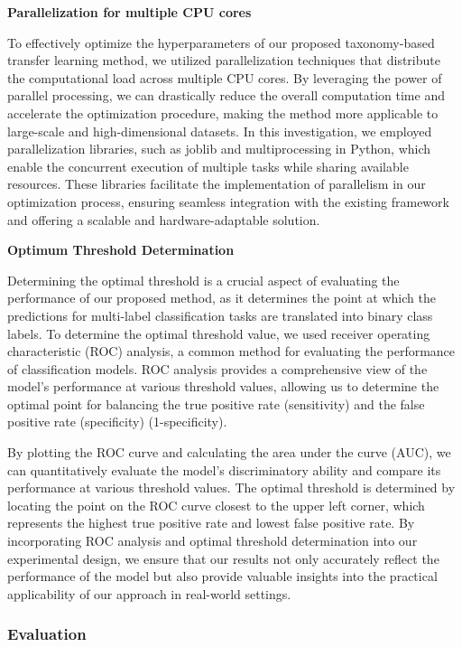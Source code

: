 \documentclass[preprint,3p,times, review]{elsarticle}
\begin{document}
\textbf{Parallelization for multiple CPU cores}

To effectively optimize the hyperparameters of our proposed taxonomy-based transfer learning method, we utilized parallelization techniques that distribute the computational load across multiple CPU cores. By leveraging the power of parallel processing, we can drastically reduce the overall computation time and accelerate the optimization procedure, making the method more applicable to large-scale and high-dimensional datasets. In this investigation, we employed parallelization libraries, such as joblib and multiprocessing in Python, which enable the concurrent execution of multiple tasks while sharing available resources. These libraries facilitate the implementation of parallelism in our optimization process, ensuring seamless integration with the existing framework and offering a scalable and hardware-adaptable solution.


\textbf{Optimum Threshold Determination}

Determining the optimal threshold is a crucial aspect of evaluating the performance of our proposed method, as it determines the point at which the predictions for multi-label classification tasks are translated into binary class labels. To determine the optimal threshold value, we used receiver operating characteristic (ROC) analysis, a common method for evaluating the performance of classification models. ROC analysis provides a comprehensive view of the model's performance at various threshold values, allowing us to determine the optimal point for balancing the true positive rate (sensitivity) and the false positive rate (specificity) (1-specificity).

By plotting the ROC curve and calculating the area under the curve (AUC), we can quantitatively evaluate the model's discriminatory ability and compare its performance at various threshold values. The optimal threshold is determined by locating the point on the ROC curve closest to the upper left corner, which represents the highest true positive rate and lowest false positive rate. By incorporating ROC analysis and optimal threshold determination into our experimental design, we ensure that our results not only accurately reflect the performance of the model but also provide valuable insights into the practical applicability of our approach in real-world settings.


\subsubsection{Evaluation}
\end{document}
